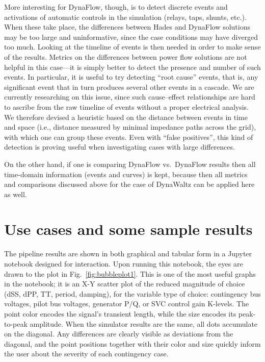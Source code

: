 \documentclass[conference]{IEEEtran}
\begin{document}
More interesting for DynaFlow, though, is to detect discrete events and
activations of automatic controls in the simulation (relays, taps, shunts,
etc.).  When these take place, the differences between Hades and DynaFlow
solutions may be too large and uninformative, since the case conditions may have
diverged too much.  Looking at the timeline of events is then needed in order to
make sense of the results.  Metrics on the differences between power flow
solutions are not helpful in this case---it is simply better to detect the
presence and number of such events.  In particular, it is useful to try
detecting ``root cause'' events, that is, any significant event that in turn
produces several other events in a cascade.  We are currently researching on
this issue, since such cause--effect relationships are hard to ascribe from the
raw timeline of events without a proper electrical analysis. We therefore
devised a heuristic based on the distance between events in time and space
(i.e., distance measured by minimal impedance paths across the grid), with which
one can group these events.  Even with ``false positives'', this kind of
detection is proving useful when investigating cases with large differences.

On the other hand, if one is comparing DynaFlow vs.\ DynaFlow results then all
time-domain information (events and curves) is kept, because then all metrics
and comparisons discussed above for the case of DynaWaltz can be applied here as
well.




\section{Use cases and some sample results}

The pipeline results are shown in both graphical and tabular form in a Jupyter
notebook designed for interaction.  Upon running this notebook, the eyes are
drawn to the plot in Fig.~\ref{fig:bubbleplot1}.  This is one of the most useful
graphs in the notebook; it is an X-Y scatter plot of the reduced magnitude of
choice (dSS, dPP, TT, period, damping), for the variable type of choice:
contingency bus voltages, pilot bus voltages, generator P/Q, or SVC control gain
K-levels. The point color encodes the signal's transient length, while the size
encodes its peak-to-peak amplitude.  When the simulator results are the same,
all dots accumulate on the diagonal. Any differences are clearly visible as
deviations from the diagonal, and the point positions together with their color
and size quickly inform the user about the severity of each contingency case.
\end{document}
